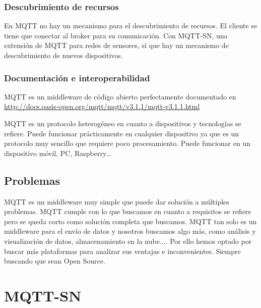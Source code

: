 \documentclass[12pt, twoside]{book}
\newcommand{\MYhref}[3][blue]{\href{#2}{\color{#1}{#3}}}
\begin{document}
\subsection{Descubrimiento de recursos}
En MQTT no hay un mecanismo para el descubrimiento de recursos. El cliente se tiene que conectar al broker para su comunicación. Con MQTT-SN, una extensión de MQTT para redes de sensores, sí que hay un mecanismo de descubrimiento de nuevos dispositivos.
\subsection{Documentación e interoperabilidad}
MQTT es un middleware de código abierto perfectamente documentado en\\
\url{ http://docs.oasis-open.org/mqtt/mqtt/v3.1.1/mqtt-v3.1.1.html}

MQTT es un protocolo heterogéneo en cuanto a dispositivos y tecnologías se refiere. Puede funcionar prácticamente en cualquier dispositivo ya que es un protocolo muy sencillo que requiere poco procesamiento. Puede funcionar en un dispositivo móvil, PC, Raspberry… 


\section{Problemas}
MQTT es un middleware muy simple que puede dar solución a múltiples problemas. MQTT cumple con lo que buscamos en cuanto a requisitos se refiere pero se queda corto como solución completa que buscamos. MQTT tan solo es un middleware para el envío de datos y nosotros buscamos algo más, como análisis y visualización de datos, almacenamiento en la nube.... Por ello hemos optado por buscar más plataformas para analizar sus ventajas e inconvenientes. Siempre buscando que sean Open Source.


\chapter{MQTT-SN}
\end{document}
